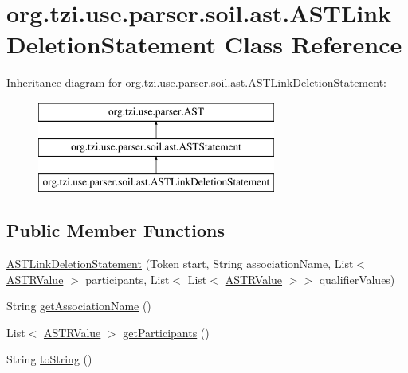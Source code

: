 \hypertarget{classorg_1_1tzi_1_1use_1_1parser_1_1soil_1_1ast_1_1_a_s_t_link_deletion_statement}{\section{org.\-tzi.\-use.\-parser.\-soil.\-ast.\-A\-S\-T\-Link\-Deletion\-Statement Class Reference}
\label{classorg_1_1tzi_1_1use_1_1parser_1_1soil_1_1ast_1_1_a_s_t_link_deletion_statement}
}
Inheritance diagram for org.\-tzi.\-use.\-parser.\-soil.\-ast.\-A\-S\-T\-Link\-Deletion\-Statement\-:\begin{figure}[H]
\begin{center}
\leavevmode
\includegraphics[height=3.000000cm]{classorg_1_1tzi_1_1use_1_1parser_1_1soil_1_1ast_1_1_a_s_t_link_deletion_statement}
\end{center}
\end{figure}
\subsection*{Public Member Functions}
\begin{DoxyCompactItemize}
\item 
\hyperlink{classorg_1_1tzi_1_1use_1_1parser_1_1soil_1_1ast_1_1_a_s_t_link_deletion_statement_a4e23e68e9cfd65a22da8c381eb76fa6d}{A\-S\-T\-Link\-Deletion\-Statement} (Token start, String association\-Name, List$<$ \hyperlink{classorg_1_1tzi_1_1use_1_1parser_1_1soil_1_1ast_1_1_a_s_t_r_value}{A\-S\-T\-R\-Value} $>$ participants, List$<$ List$<$ \hyperlink{classorg_1_1tzi_1_1use_1_1parser_1_1soil_1_1ast_1_1_a_s_t_r_value}{A\-S\-T\-R\-Value} $>$$>$ qualifier\-Values)
\item 
String \hyperlink{classorg_1_1tzi_1_1use_1_1parser_1_1soil_1_1ast_1_1_a_s_t_link_deletion_statement_ac4d2c43aacfb55204dc65cf6b6c3daf6}{get\-Association\-Name} ()
\item 
List$<$ \hyperlink{classorg_1_1tzi_1_1use_1_1parser_1_1soil_1_1ast_1_1_a_s_t_r_value}{A\-S\-T\-R\-Value} $>$ \hyperlink{classorg_1_1tzi_1_1use_1_1parser_1_1soil_1_1ast_1_1_a_s_t_link_deletion_statement_a9e9d46749e91c4729524b8a6f4ed9325}{get\-Participants} ()
\item 
String \hyperlink{classorg_1_1tzi_1_1use_1_1parser_1_1soil_1_1ast_1_1_a_s_t_link_deletion_statement_a664fa5aae2bb6cf4f0c5392d2006ee20}{to\-String} ()
\end{DoxyCompactItemize}
